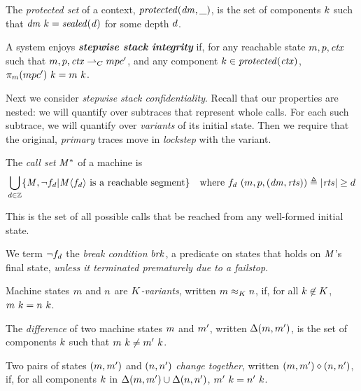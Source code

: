 \documentclass[acmsmall,review,anonymous]{acmart}\settopmatter{printfolios=true,printccs=false,printacmref=false}
\begin{document}
{
The \emph{protected set} of a context, \(\mathit{protected}(\mathit{dm},\_)\), is the
set of components \(k\) such that \(\mathit{dm} ~ k = \mathit{sealed(d)}\)
for some depth \(d\).

A system enjoys \textit{\textbf{stepwise stack integrity}} if, for any reachable state
\(m,p,\mathit{ctx}\) such that \(m,p,\mathit{ctx} \overset{}{\rightharpoonup}_C mpc'\),
and any component \(k \in \mathit{protected}(\mathit{ctx})\),
\(\pi_m(mpc') ~ k = m ~ k\).

Next we consider {\em stepwise stack confidentiality}. Recall that our properties are
nested: we will quantify over subtraces that represent whole calls. For each such
subtrace, we will quantify over {\em variants} of its initial state. Then we require
that the original, {\em primary} traces move in {\em lockstep} with the variant.

 The \emph{call set} \(\mathit{M}^*\) of a machine is
\[\begin{aligned}
\bigcup_{d \in \mathbb{Z}} \{\mathit{M}, \neg f_d | \mathit{M}\langle f_d \rangle
\text{ is a reachable segment}\} \hspace{1em} &
\text{where } f_d ~ (m,p,(\mathit{dm},\mathit{rts})) \triangleq |\mathit{rts}| \geq d \\
\end{aligned}\]

This is the set of all possible calls that be reached from any well-formed initial state.

We term \(\neg f_d\) the {\em break condition} \(\mathit{brk}\), a predicate on
states that holds on \(\mathit{M}\)'s final state, {\em unless it terminated prematurely due to a failstop}.

 Machine states \(m\) and \(n\) are {\em \(K\)-variants},
written \(m \approx_K n\), if, for
all \(k \not \in K\), \(m ~ k = n ~ k\).

 The \emph{difference} of two machine states \(m\) and \(m'\), written \(\Delta(m,m')\),
is the set of components \(k\)
such that \(m ~ k \not = m' ~ k\).

 Two pairs of states \((m,m')\) and \((n,n')\)
 {\em change together}, written \((m,m') \diamond (n,n')\), if, for all components \(k\) in
\(\Delta(m,m') \cup \Delta(n,n')\),
\(m' ~ k = n' ~ k\).

}
\end{document}

